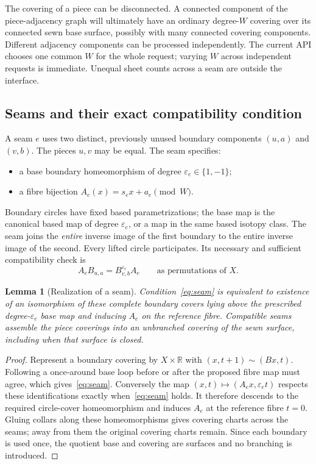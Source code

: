 \documentclass[11pt,a4paper]{article}
\newtheorem{lemma}[theorem]{Lemma}
\theoremstyle{definition}\newtheorem{definition}[theorem]{Definition}
\theoremstyle{remark}\newtheorem{remark}[theorem]{Remark}
\begin{document}
The covering of a piece can be disconnected. A connected component of the
piece-adjacency graph will ultimately have an ordinary degree-$W$ covering
over its connected sewn base surface, possibly with many connected covering
components. Different adjacency components can be processed independently.
The current API chooses one common $W$ for the whole request; varying $W$
across independent requests is immediate. Unequal sheet counts across a seam
are outside the interface.

\subsection{Seams and their exact compatibility condition}

A seam $e$ uses two distinct, previously unused boundary components
$(u,a)$ and $(v,b)$. The pieces $u,v$ may be equal. The seam specifies:
\begin{itemize}
\item a base boundary homeomorphism of degree $\varepsilon_e\in\{1,-1\}$;
\item a fibre bijection $A_e(x)=s_ex+a_e\pmod W$.
\end{itemize}
Boundary circles have fixed based parametrizations; the base map is the
canonical based map of degree $\varepsilon_e$, or a map in the same based
isotopy class. The seam joins the \emph{entire} inverse image of the first boundary to the
entire inverse image of the second. Every lifted circle participates. Its
necessary and sufficient compatibility check is
\begin{equation}\label{eq:seam}
 A_e B_{u,a}=B_{v,b}^{\varepsilon_e}A_e
 \qquad\text{as permutations of }X.
\end{equation}

\begin{lemma}[Realization of a seam]\label{lem:seam}
Condition~\eqref{eq:seam} is equivalent to existence of an isomorphism of
these complete boundary covers lying above the prescribed degree-$
\varepsilon_e$ base map and inducing $A_e$ on the reference fibre. Compatible
seams assemble the piece coverings into an unbranched covering of the sewn
surface, including when that surface is closed.
\end{lemma}
\begin{proof}
Represent a boundary covering by $X\times\mathbb R$ with
$(x,t+1)\sim(Bx,t)$. Following a once-around base loop before or after the
proposed fibre map must agree, which gives~\eqref{eq:seam}. Conversely the
map $(x,t)\mapsto(A_ex,\varepsilon_e t)$ respects these identifications
exactly when~\eqref{eq:seam} holds. It therefore descends to the required
circle-cover homeomorphism and induces $A_e$ at the reference fibre $t=0$.
Gluing collars along these
homeomorphisms gives covering charts across the seams; away from them the
original covering charts remain. Since each boundary is used once, the
quotient base and covering are surfaces and no branching is introduced.
\end{proof}
\end{document}

